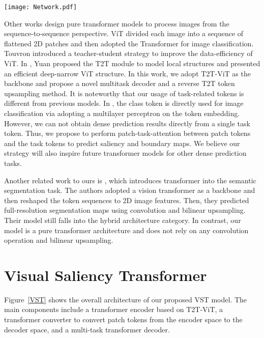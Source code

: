 \documentclass[10pt,twocolumn,letterpaper]{article}
\begin{document}
\begin{figure*}[!t]
  \graphicspath{{Figures/Network/}}
  \centering
  \texttt{[image: Network.pdf]}
\caption{Overall architecture of our proposed VST model for both RGB and RGB-D SOD. Dotted line represents exclusive components for RGB-D SOD.}
  \label{VST}
  \vspace{-0.4cm}
\end{figure*}


Other works design pure transformer models to process images from the sequence-to-sequence perspective. ViT \cite{dosovitskiy2020image} divided each image into a sequence of flattened 2D patches and then adopted the Transformer for image classification.
Touvron \etal \cite{touvron2020training} introduced a teacher-student strategy 
to improve the data-efficiency of ViT. In \cite{yuan2021tokens}, Yuan \etal proposed the T2T module to model local structures
and presented an efficient deep-narrow ViT structure. 
In this work, we adopt T2T-ViT as the backbone and propose a novel multitask decoder and a reverse T2T token upsampling method. It is noteworthy that our usage of task-related tokens is different from previous models. In \cite{dosovitskiy2020image,touvron2020training,deng2009imagenet}, the class token is directly used for image classification via adopting a multilayer perceptron on the token embedding. 
However, 
we can not obtain dense prediction results directly from a single task token. Thus, we propose to perform patch-task-attention between patch tokens and the task tokens to predict saliency and boundary maps. We believe our strategy will also inspire future transformer models for other dense prediction tasks.



Another related work to ours is \cite{zheng2020rethinking}, which introduces transformer into the semantic segmentation task. The authors adopted a vision transformer as a backbone and then reshaped the token sequences to 2D image features. Then, 
they predicted full-resolution segmentation maps using convolution and bilinear upsampling. 
Their model still falls into the hybrid architecture category. In contrast, our model is a pure transformer architecture and does not rely on any convolution operation and bilinear upsampling.






\section{Visual Saliency Transformer}
Figure~\ref{VST} shows the overall architecture of our proposed VST model.
The main components include a transformer encoder based on T2T-ViT, a transformer converter to convert patch tokens from the encoder space to the decoder space, and a multi-task transformer decoder.
\end{document}
